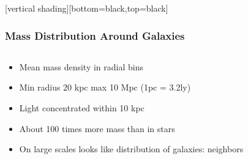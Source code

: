 \documentclass{beamer}
\begin{document}
{
    [vertical shading][bottom=black,top=black]


    \frame
    {
        \frametitle{Mass Distribution Around Galaxies}

        \begin{columns}
            \begin{column}{0.5\textwidth}    
                \begin{itemize}

                    \item Mean mass density in radial bins

                    \item Min radius 20 kpc max 10 Mpc {\color{gold} (1pc = 3.2ly)}

                    \item Light concentrated within 10 kpc

                    \item About 100 times more mass than in stars

                    \item On large scales looks like distribution of galaxies:
                        neighbors



\end{itemize}
\end{column}
\end{columns}}}
\end{document}
